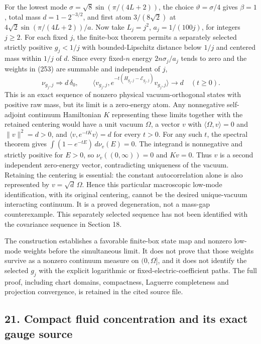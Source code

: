\documentclass[
  11pt,
]{article}
\begin{document}
For the lowest mode \(\sigma=\sqrt8\sin(\pi/(4L+2))\), the choice
\(\vartheta=\sigma/4\) gives \(\beta=1\), total mass \(d=1-2^{-3/2}\),
and first atom \(3/(8\sqrt2)\) at \(4\sqrt2\sin(\pi/(4L+2))/a\). Now
take \(L_j=j^2\), \(a_j=1/(100j)\), for integers \(j\ge2\). For each
fixed \(j\), the finite-box theorem permits a separately selected
strictly positive \(g_j<1/j\) with bounded-Lipschitz distance below
\(1/j\) and centered mass within \(1/j\) of \(d\). Since every
fixed-\(n\) energy \(2n\sigma_j/a_j\) tends to zero and the weights in
(253) are summable and independent of \(j\), \[
 \nu_{g_j,j}\Longrightarrow d\,\delta_0,\qquad
 \langle v_{g_j,j},e^{-t(H_{g_j,j}-\mathcal E_{g_j,j})}v_{g_j,j}\rangle
 \longrightarrow d\quad(t\ge0).
 \tag{256}
\] This is an exact sequence of nonzero physical vacuum-orthogonal
states with positive raw mass, but its limit is a zero-energy atom. Any
nonnegative self-adjoint continuum Hamiltonian \(K\) representing these
limits together with the retained centering would have a unit vacuum
\(\Omega\), a vector \(v\) with \(\langle\Omega,v\rangle=0\) and
\(\|v\|^2=d>0\), and \(\langle v,e^{-tK}v\rangle=d\) for every \(t>0\).
For any such \(t\), the spectral theorem gives
\(\int(1-e^{-tE})\,d\nu_v(E)=0\). The integrand is nonnegative and
strictly positive for \(E>0\), so \(\nu_v((0,\infty))=0\) and \(Kv=0\).
Thus \(v\) is a second independent zero-energy vector, contradicting
uniqueness of the vacuum. Retaining the centering is essential: the
constant autocorrelation alone is also represented by
\(v=\sqrt d\,\Omega\). Hence this particular macroscopic low-mode
identification, with its original centering, cannot be the desired
unique-vacuum interacting continuum. It is a proved degeneration, not a
mass-gap counterexample. This separately selected sequence has not been
identified with the covariance sequence in Section 18.

The construction establishes a favorable finite-box state map and
nonzero low-mode weights before the simultaneous limit. It does not
prove that those weights survive as a nonzero continuum measure on
\((0,\Omega]\), and it does not identify the selected \(g_j\) with the
explicit logarithmic or fixed-electric-coefficient paths. The full
proof, including chart domains, compactness, Laguerre completeness and
projection convergence, is retained in the cited source file.

\subsection{21. Compact fluid concentration and its exact gauge
source}\label{compact-fluid-concentration-and-its-exact-gauge-source}
\end{document}
